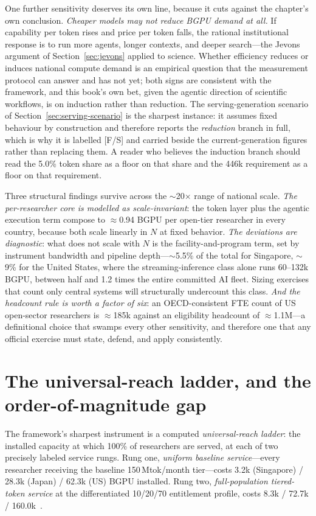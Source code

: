 One further sensitivity deserves its own line, because it cuts against the chapter's own conclusion. \emph{Cheaper models may not reduce BGPU demand at all.} If capability per token rises and price per token falls, the rational institutional response is to run more agents, longer contexts, and deeper search---the Jevons argument of Section~\ref{sec:jevons} applied to science. Whether efficiency reduces or induces national compute demand is an empirical question that the measurement protocol can answer and has not yet; both signs are consistent with the framework, and this book's own bet, given the agentic direction of scientific workflows, is on induction rather than reduction. The serving-generation scenario of Section~\ref{sec:serving-scenario} is the sharpest instance: it assumes fixed behaviour by construction and therefore reports the \emph{reduction} branch in full, which is why it is labelled [F/S] and carried beside the current-generation figures rather than replacing them. A reader who believes the induction branch should read the 5.0\% token share as a floor on that share and the 446k requirement as a floor on that requirement.

Three structural findings survive across the $\sim$20$\times$ range of national scale. \emph{The per-researcher core is modelled as scale-invariant}: the token layer plus the agentic execution term compose to $\approx$0.94 BGPU per open-tier researcher in every country, because both scale linearly in $N$ at fixed behavior. \emph{The deviations are diagnostic}: what does not scale with $N$ is the facility-and-program term, set by instrument bandwidth and pipeline depth---$\sim$5.5\% of the total for Singapore, $\sim$9\% for the United States, where the streaming-inference class alone runs 60--132k BGPU, between half and 1.2 times the entire committed AI fleet. Sizing exercises that count only central systems will structurally undercount this class. \emph{And the headcount rule is worth a factor of six}: an OECD-consistent FTE count of US open-sector researchers is $\approx$185k against an eligibility headcount of $\approx$1.1M---a definitional choice that swamps every other sensitivity, and therefore one that any official exercise must state, defend, and apply consistently.

\section{The universal-reach ladder, and the order-of-magnitude gap}

The framework's sharpest instrument is a computed \emph{universal-reach ladder}: the installed capacity at which 100\% of researchers are served, at each of two precisely labeled service rungs. Rung one, \emph{uniform baseline service}---every researcher receiving the baseline 150\,Mtok/month tier---costs 3.2k (Singapore) / 28.3k (Japan) / 62.3k (US) BGPU installed. Rung two, \emph{full-population tiered-token service} at the differentiated 10/20/70 entitlement profile, costs 8.3k / 72.7k / 160.0k~\cite{ai4s-framework}.

